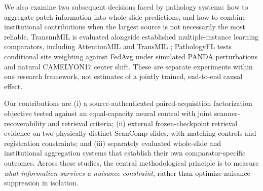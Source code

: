 We also examine two subsequent decisions faced by pathology systems: how to aggregate patch information into whole-slide predictions, and how to combine institutional contributions when the largest source is not necessarily the most reliable. TransnnMIL is evaluated alongside established multiple-instance learning comparators, including AttentionMIL \cite{ilse2018attention} and TransMIL \cite{shao2021transmil}; PathologyFL tests conditional site weighting against FedAvg under simulated PANDA perturbations and natural CAMELYON17 center shift. These are separate experiments within one research framework, not estimates of a jointly trained, end-to-end causal effect.

Our contributions are (i) a source-authenticated paired-acquisition factorization objective tested against an equal-capacity neural control with joint scanner-recoverability and retrieval criteria; (ii) external frozen-checkpoint retrieval evidence on two physically distinct ScanComp slides, with matching controls and registration constraints; and (iii) separately evaluated whole-slide and institutional aggregation systems that establish their own comparator-specific outcomes. Across these studies, the central methodological principle is to measure \emph{what information survives a nuisance constraint}, rather than optimize nuisance suppression in isolation.
